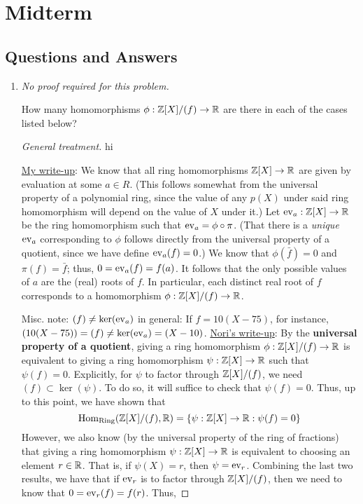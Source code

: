 \documentclass[../notes.tex]{subfiles}
\begin{document}
\section{Midterm}
\subsection*{Questions and Answers}
\begin{enumerate}
    \item {}\emph{No proof required for this problem.}\par
    How many homomorphisms $\phi:\mathbb{Z}[X]/(f)\to\mathbb{R}$ are there in each of the cases listed below?
    \begin{proof}[General treatment]
        {\color{white}hi}\par
        \underline{My write-up}: We know that all ring homomorphisms $\mathbb{Z}[X]\to\mathbb{R}$ are given by evaluation at some $a\in R$. (This follows somewhat from the universal property of a polynomial ring, since the value of any $p(X)$ under said ring homomorphism will depend on the value of $X$ under it.) Let $\operatorname{ev}_a:\mathbb{Z}[X]\to\mathbb{R}$ be the ring homomorphism such that $\operatorname{ev}_a=\phi\circ\pi$. (That there is a \emph{unique} $\operatorname{ev}_a$ corresponding to $\phi$ follows directly from the universal property of a quotient, since we have define $\operatorname{ev}_a(f)=0$.) We know that $\phi(\bar{f})=0$ and $\pi(f)=\bar{f}$; thus, $0=\operatorname{ev}_a(f)=f(a)$. It follows that the only possible values of $a$ are the (real) roots of $f$. In particular, each distinct real root of $f$ corresponds to a homomorphism $\phi:\mathbb{Z}[X]/(f)\to\mathbb{R}$.\par
        Misc. note: $(f)\neq\ker(\operatorname{ev}_a)$ in general: If $f=10(X-75)$, for instance, $(10(X-75))=(f)\neq\ker(\operatorname{ev}_a)=(X-10)$.
        \underline{Nori's write-up}: By the \textbf{universal property of a quotient}, giving a ring homomorphism $\phi:\mathbb{Z}[X]/(f)\to\mathbb{R}$ is equivalent to giving a ring homomorphism $\psi:\mathbb{Z}[X]\to\mathbb{R}$ such that $\psi(f)=0$. Explicitly, for $\psi$ to factor through $\mathbb{Z}[X]/(f)$, we need $(f)\subset\ker(\psi)$. To do so, it will suffice to check that $\psi(f)=0$. Thus, up to this point, we have shown that
        \begin{equation*}
            \operatorname{Hom}_\text{Ring}(\mathbb{Z}[X]/(f),\mathbb{R}) = \{\psi:\mathbb{Z}[X]\to\mathbb{R}:\psi(f)=0\}
        \end{equation*}
        However, we also know (by the universal property of the ring of fractions) that giving a ring homomorphism $\psi:\mathbb{Z}[X]\to\mathbb{R}$ is equivalent to choosing an element $r\in\mathbb{R}$. That is, if $\psi(X)=r$, then $\psi=\operatorname{ev}_r$. Combining the last two results, we have that if $\operatorname{ev}_r$ is to factor through $\mathbb{Z}[X]/(f)$, then we need to know that $0=\operatorname{ev}_r(f)=f(r)$. Thus,

\end{proof}
\end{enumerate}
\end{document}
